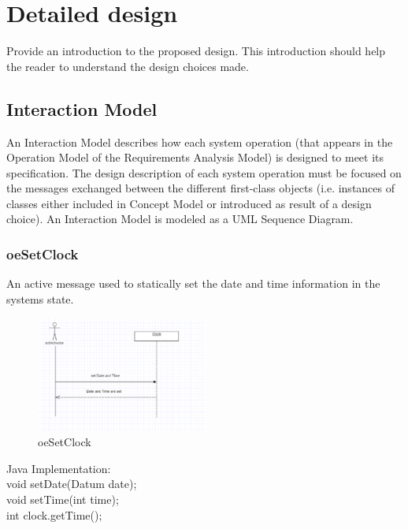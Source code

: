 \chapter{Detailed design}
\label{chap:detDesign}


Provide an introduction to the proposed design. This introduction should help
the reader to understand the design choices made.


\section{Interaction Model}
An Interaction Model describes how each \gls{system operation} (that appears in the
Operation Model of the \msrmessir Requirements Analysis Model) is designed to meet
its specification. The design description of each system operation must be
focused on the messages exchanged between the different first-class objects
(i.e. instances of classes either included in Concept Model or introduced as
result of a design choice). An Interaction Model is modeled as a UML Sequence
Diagram.


\subsection{oeSetClock}
An active message used to statically set the date and time information in the
systems state.\\

\begin{figure}[H]
\begin{center}
\includegraphics[width=0.5\textwidth]{./images/oeSetClock.eps} 
\end{center}
\caption{oeSetClock}
\end{figure}

\noindent Java Implementation:\\
void setDate(Datum date);\\
void setTime(int time);\\
int clock.getTime();\\


